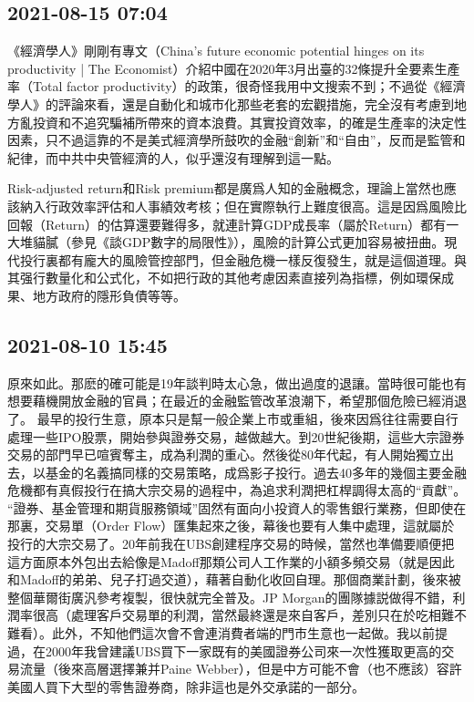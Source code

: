 \documentclass[twocolumn]{ctexart}
\begin{document}
\subsection*{2021-08-15 07:04}

《經濟學人》剛剛有專文（China’s future economic potential hinges on its productivity | The Economist）介紹中國在2020年3月出臺的32條提升全要素生產率（Total factor productivity）的政策，很奇怪我用中文搜索不到；不過從《經濟學人》的評論來看，還是自動化和城市化那些老套的宏觀措施，完全沒有考慮到地方亂投資和不追究騙補所帶來的資本浪費。其實投資效率，的確是生產率的決定性因素，只不過這靠的不是美式經濟學所鼓吹的金融“創新”和“自由”，反而是監管和紀律，而中共中央管經濟的人，似乎還沒有理解到這一點。

Risk-adjusted return和Risk premium都是廣爲人知的金融概念，理論上當然也應該納入行政效率評估和人事績效考核；但在實際執行上難度很高。這是因爲風險比回報（Return）的估算還要難得多，就連計算GDP成長率（屬於Return）都有一大堆貓膩（參見《談GDP數字的局限性》），風險的計算公式更加容易被扭曲。現代投行裏都有龐大的風險管控部門，但金融危機一樣反復發生，就是這個道理。與其强行數量化和公式化，不如把行政的其他考慮因素直接列為指標，例如環保成果、地方政府的隱形負債等等。
\subsection*{2021-08-10 15:45}

原來如此。那麽的確可能是19年談判時太心急，做出過度的退讓。當時很可能也有想要藉機開放金融的官員；在最近的金融監管改革浪潮下，希望那個危險已經消退了。
最早的投行生意，原本只是幫一般企業上市或重組，後來因爲往往需要自行處理一些IPO股票，開始參與證券交易，越做越大。到20世紀後期，這些大宗證券交易的部門早已喧賓奪主，成為利潤的重心。然後從80年代起，有人開始獨立出去，以基金的名義搞同樣的交易策略，成爲影子投行。過去40多年的幾個主要金融危機都有真假投行在搞大宗交易的過程中，為追求利潤把杠桿調得太高的“貢獻”。
“證券、基金管理和期貨服務領域”固然有面向小投資人的零售銀行業務，但即使在那裏，交易單（Order Flow）匯集起來之後，幕後也要有人集中處理，這就屬於投行的大宗交易了。20年前我在UBS創建程序交易的時候，當然也準備要順便把這方面原本外包出去給像是Madoff那類公司人工作業的小額多頻交易（就是因此和Madoff的弟弟、兒子打過交道），藉著自動化收回自理。那個商業計劃，後來被整個華爾街廣汎參考複製，很快就完全普及。JP Morgan的團隊據説做得不錯，利潤率很高（處理客戶交易單的利潤，當然最終還是來自客戶，差別只在於吃相難不難看）。此外，不知他們這次會不會連消費者端的門市生意也一起做。我以前提過，在2000年我曾建議UBS買下一家既有的美國證券公司來一次性獲取更高的交易流量（後來高層選擇兼并Paine Webber），但是中方可能不會（也不應該）容許美國人買下大型的零售證券商，除非這也是外交承諾的一部分。
\end{document}
